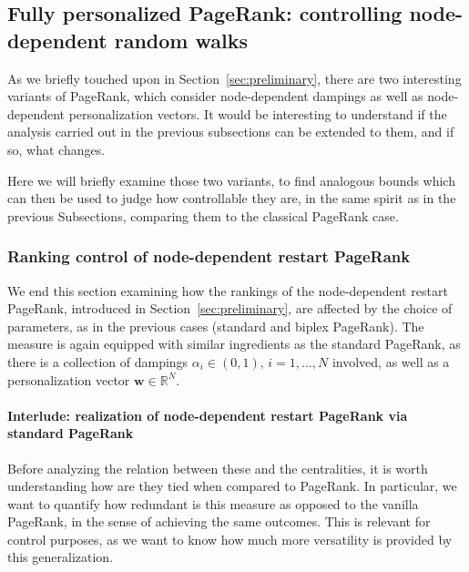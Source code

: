 \documentclass[sn-mathphys-ay]{sn-jnl}%
\newcommand{\R}{\mathbb{R}}
\newcommand{\bw}{\bm{w}}
\theoremstyle{thmstyleone}%
\theoremstyle{thmstyletwo}%
\theoremstyle{thmstylethree}%
\begin{document}
\subsection{Fully personalized PageRank: controlling node-dependent random walks}\label{subsec:paramRelatedcontrol}

As we briefly touched upon in Section~\ref{sec:preliminary}, there are two interesting variants of PageRank, which consider node-dependent dampings as well as node-dependent personalization vectors. It would be interesting to understand if the analysis carried out in the previous subsections can be extended to them, and if so, what changes.

Here we will briefly examine those two variants, to find analogous bounds which can then be used to judge how controllable they are, in the same spirit as in the previous Subsections, comparing them to the classical PageRank case.



\subsubsection{Ranking control of node-dependent restart PageRank}

We end this section examining how the rankings of the node-dependent restart PageRank, introduced in Section~\ref{sec:preliminary}, are affected by the choice of parameters, as in the previous cases (standard and biplex PageRank). The measure is again equipped with similar ingredients as the standard PageRank, as there is a collection of dampings $\alpha_i \in (0,1),\,i=1,\dots,N$ involved, as well as a personalization vector $\bw\in\R^N$.




\paragraph{Interlude: realization of node-dependent restart PageRank via standard PageRank}


Before analyzing the relation between these and the centralities, it is worth understanding how are they tied when compared to PageRank. In particular, we want to quantify how redundant is this measure as opposed to the vanilla PageRank, in the sense of achieving the same outcomes. This is relevant for control purposes, as we want to know how much more versatility is provided by this generalization.
\end{document}
